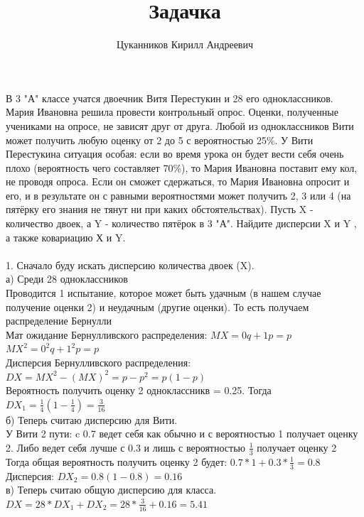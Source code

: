 \documentclass[fleqn]{article}
\begin{document}
\title{Задачка}
\author{Цуканников Кирилл Андреевич}
\maketitle
\newpage
В 3 "А" классе учатся двоечник Витя Перестукин и 28 его одноклассников. Мария Ивановна
решила провести контрольный опрос. Оценки, полученные учениками на опросе, не зависят
друг от друга. Любой из одноклассников Вити может получить любую оценку от 2 до 5
с вероятностью 25\%. У Вити Перестукина ситуация особая: если во время урока он будет
вести себя очень плохо (вероятность чего составляет 70\%), то Мария Ивановна поставит ему
кол, не проводя опроса. Если он сможет сдержаться, то Мария Ивановна опросит и его, и в
результате он с равными вероятностями может получить 2, 3 или 4 (на пятёрку его знания не
тянут ни при каких обстоятельствах). Пусть X - количество двоек, а Y - количество пятёрок
в 3 "А". Найдите дисперсии X и Y , а также ковариацию Х и Y. \\
\\
1. Сначало буду искать дисперсию количества двоек (X). \\
а) Среди 28 одноклассников \\
Проводится 1 испытание, которое может быть удачным (в нашем случае получение оценки 2) и неудачным (другие оценки). То есть получаем распределение Бернулли\\
Мат ожидание Бернулливского распределения: $MX = 0q + 1p = p$ \\
$ MX^2 = 0^2q + 1^2p = p $ \\
Дисперсия Бернулливского распределения: $DX = MX^2 - (MX)^2 = p - p^2 =  p(1-p)$ \\
Вероятность получить оценку 2 одноклассникв = 0.25. Тогда   $DX_1 = \frac{1}{4} (1-\frac{1}{4}) = \frac{3}{16}$ \\
б) Теперь считаю дисперсию для Вити.\\
У Вити 2 пути: c 0.7 ведет себя как обычно и с вероятностью 1 получает оценку 2. Либо ведет себя лучше с 0.3 и лишь с вероятностью $ \frac{1}{3} $ получает оценку 2\\
Тогда общая вероятность получить оценку 2 будет: $ 0.7 * 1 + 0.3 * \frac{1}{3} = 0.8 $ \\
Дисперсия: $ DX_2 = 0.8(1 - 0.8) = 0.16 $ \\
в) Теперь считаю общую дисперсию для класса. \\
$ DX = 28 * DX_1 + DX_2 = 28 * \frac{3}{16} + 0.16 = 5.41 $ \\
\\
\end{document}
